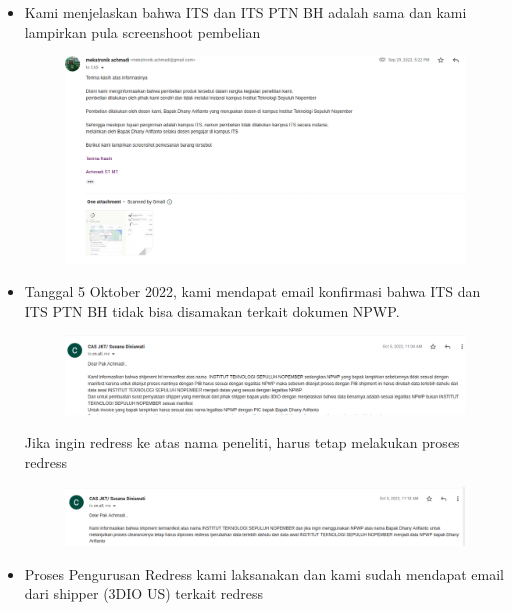 \documentclass{article} %
\begin{document}
\begin{itemize}
		\item Kami menjelaskan bahwa ITS dan ITS PTN BH adalah sama dan kami lampirkan pula screenshoot pembelian
		
		\begin{figure}[!ht]
			\centering
			\includegraphics[width=400pt]{images/impor_9}
		\end{figure}
		
		\newpage
		\item Tanggal 5 Oktober 2022, kami mendapat email konfirmasi bahwa ITS dan ITS PTN BH tidak bisa disamakan terkait dokumen NPWP.
		
		\begin{figure}[!ht]
			\centering
			\includegraphics[width=400pt]{images/impor_10}
		\end{figure}
	
		Jika ingin redress ke atas nama peneliti, harus tetap melakukan proses redress
		
		\begin{figure}[!ht]
			\centering
			\includegraphics[width=400pt]{images/impor_11}
		\end{figure}
	
		\item Proses Pengurusan Redress kami laksanakan dan kami sudah mendapat email dari shipper (3DIO US) terkait redress
		

\end{itemize}
\end{document}
